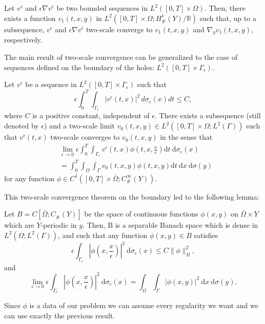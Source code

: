 \begin{theorem} Let $v^{\epsilon}$ and $\epsilon \nabla v^{\epsilon}$ be two bounded sequences in $L^{2}([0, T] \times \Omega)$. Then, there exists a function $v_{1}(t, x, y)$ in $L^{2}\left([0, T] \times \Omega ; H_{\#}^{1}(Y) / \mathbb{R}\right)$ such that, up to a subsequence, $v^{\epsilon}$ and $\epsilon \nabla v^{\epsilon}$ two-scale converge to $v_{1}(t, x, y)$ and $\nabla_{y} v_{1}(t, x, y)$, respectively.
\label{theorem 7.4}\end{theorem}
The main result of two-scale convergence can be generalized to the case of sequences defined on the boundary of the holes: $L^{2}\left([0, T] \times \Gamma_{\epsilon}\right)$.
\begin{theorem}
Let $v^{\epsilon}$ be a sequence in $L^{2}\left([0, T] \times \Gamma_{\epsilon}\right)$ such that
$$
\epsilon \int_{0}^{T} \int_{\Gamma_{\epsilon}}\left|v^{\epsilon}(t, x)\right|^{2} \, d\sigma_{\epsilon}(x)dt \leq C,
$$
where $C$ is a positive constant, independent of $\epsilon$. There exists a subsequence (still denoted by $\epsilon$) and a two-scale limit $v_{0}(t, x, y) \in L^{2}\left([0, T] \times \Omega ; L^{2}(\Gamma)\right)$ such that $v^{\epsilon}(t, x)$ two-scale converges to $v_{0}(t, x, y)$ in the sense that
$$
\begin{aligned}
&\lim _{\epsilon \rightarrow 0} \epsilon \int_{0}^{T} \int_{\Gamma_{\epsilon}} v^{\epsilon}(t, x) \phi\left(t, x, \frac{x}{\epsilon}\right) \mathrm{d} t \mathrm{~d} \sigma_{\epsilon}(x) \\
&=\int_{0}^{T} \int_{\Omega} \int_{\Gamma} v_{0}(t, x, y) \phi(t, x, y) \mathrm{d} t \mathrm{~d} x \mathrm{~d} \sigma(y)
\end{aligned}
$$
for any function $\phi \in C^{1}\left([0, T] \times \bar{\Omega} ; C_{\#}^{\infty}(Y)\right)$.
\label{thm 7.5}\end{theorem}
This two-scale convergence theorem on the boundary led to the following lemma:
\begin{lemma} Let $B=C\left[\bar{\Omega} ; C_{\#}(Y)\right]$ be the space of continuous functions $\phi(x, y)$ on $\bar{\Omega} \times Y$ which are $Y$-periodic in $y$. Then, B is a separable Banach space which is dense in $L^{2}\left(\Omega ; L^{2}(\Gamma)\right)$, and such that any function $\phi(x, y) \in B$ satisfies
$$
\epsilon \int_{\Gamma_{\epsilon}}\left|\phi\left(x, \frac{x}{\epsilon}\right)\right|^{2} \mathrm{~d} \sigma_{\epsilon}(x) \leq C\|\phi\|_{B}^{2},
$$
and
$$
\lim _{\epsilon \rightarrow 0} \epsilon \int_{\Gamma_{\epsilon}}\left|\phi\left(x, \frac{x}{\epsilon}\right)\right|^{2} \mathrm{~d} \sigma_{\epsilon}(x)=\int_{\Omega} \int_{\Gamma}|\phi(x, y)|^{2} \mathrm{~d} x \mathrm{~d} \sigma(y) .
$$
\label{lemma 7.4}\end{lemma}
Since $\phi$ is a data of our problem we can assume every regularity we want and we can use exactly the previous result.
